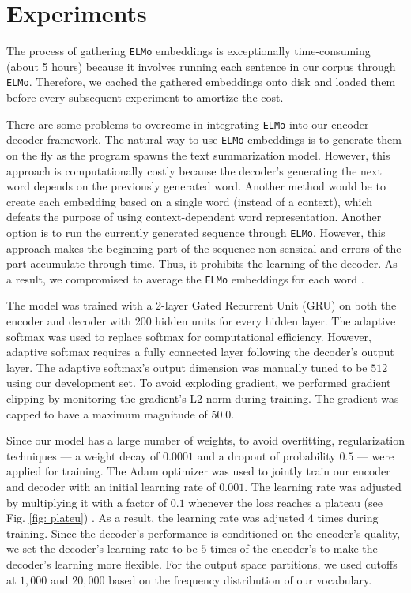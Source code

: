 \section{Experiments}
\label{sec: exp}

The process of gathering \texttt{ELMo} embeddings is exceptionally time-consuming (about 5 hours) because it involves running each sentence in our corpus through \texttt{ELMo}. Therefore, we cached the gathered embeddings onto disk and loaded them before every subsequent experiment to amortize the cost. 

There are some problems to overcome in integrating \texttt{ELMo} into our encoder-decoder framework. The natural way to use \texttt{ELMo} embeddings is to generate them on the fly as the program spawns the text summarization model. However, this approach is computationally costly because the decoder's generating the next word depends on the previously generated word. Another method would be to create each embedding based on a single word (instead of a context), which defeats the purpose of using context-dependent word representation. Another option is to run the currently generated sequence through \texttt{ELMo}. However, this approach makes the beginning part of the sequence non-sensical and errors of the part accumulate through time. Thus, it prohibits the learning of the decoder.
As a result, we compromised to average the \texttt{ELMo} embeddings for each word .

The model was trained with a 2-layer Gated Recurrent Unit (GRU) on both the encoder and decoder with $200$ hidden units for every hidden layer. The adaptive softmax was used to replace softmax for computational efficiency. However, adaptive softmax requires a fully connected layer following the decoder's output layer.  The adaptive softmax's output dimension was manually tuned to be $512$ using our development set. To avoid exploding gradient, we performed gradient clipping by monitoring the gradient's L2-norm during training. The gradient was capped to have a maximum magnitude of $50.0$.

Since our model has a large number of weights, to avoid overfitting, regularization techniques --- a weight decay of $0.0001$ and a dropout of probability $0.5$ --- were applied for training. The Adam optimizer \cite{kingma2014adam} was used to jointly train  our encoder and decoder with an initial learning rate of $0.001$. The learning rate was adjusted by multiplying it with a factor of $0.1$ whenever the loss reaches a plateau (see Fig. \ref{fig: plateu}) . As a result, the learning rate was adjusted $4$ times during training. Since the decoder's performance is conditioned on the encoder's quality, we set the decoder's learning rate to be $5$ times of the encoder's to make the decoder's learning more flexible. For the output space partitions, we used cutoffs at $1,000$ and $20,000$ based on the frequency distribution of our vocabulary.  

